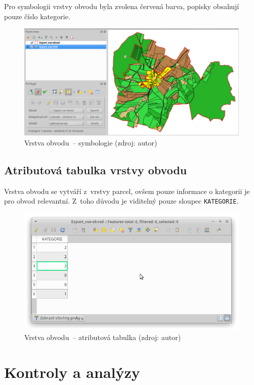 Pro symbologii vrstvy obvodu byla zvolena červená barva, popisky
obsahují pouze číslo kategorie.

	\begin{figure}[H] \centering
		\includegraphics[width=1.0\textwidth]{./pictures/symbologie_obvod.png}
		\caption[Vrstva obvodu~– symbologie]{Vrstva obvodu~–
symbologie (zdroj: autor)}
		\label{fig:manual_symbologie_obvod}
 	\end{figure}

\subsection{Atributová tabulka vrstvy obvodu}
\label{manual_editace_tabulka}

Vrstva obvodu se vytváří z~vrstvy parcel, ovšem pouze informace o
kategorii je pro obvod relevantní. Z~toho důvodu je viditelný pouze
sloupec \texttt{KATEGORIE}.

	\begin{figure}[H] \centering
		\includegraphics[width=.7\textwidth]{./pictures/editace-tabulka.png}
		\caption[Vrstva obvodu~– atributová tabulka]{Vrstva
obvodu~– atributová tabulka (zdroj: autor)}
		\label{fig:manual_tabulka_obvod}
 	\end{figure}

\newpage

\section{Kontroly a analýzy}
\label{manual_kontroly_analyzy}

